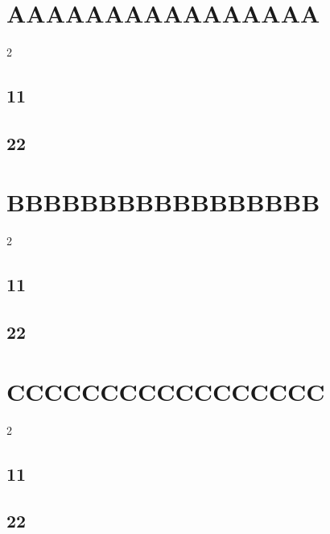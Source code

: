 \documentclass[openany]{book}
\begin{document}
\chapter{AAAAAAAAAAAAAAAA}
\begin{multicols}{2}
\section{11}
\lipsum[1-3]
\section{22}
\lipsum[1-3]
\end{multicols}

\chapter*{BBBBBBBBBBBBBBBBB}
\begin{multicols}{2}
\section{11}
\lipsum[1-3]
\section{22}
\lipsum[1-3]
\end{multicols}

\chapter{CCCCCCCCCCCCCCCCC}
\begin{multicols}{2}
\section{11}
\lipsum[1-3]
\section{22}
\lipsum[1-3]
\end{multicols}
\end{document}
